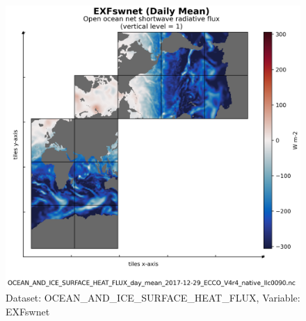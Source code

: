\begin{figure}[H]
\centering
\includegraphics[scale=0.55]{../images/plots/v4r4/native_plots/Ocean_and_Sea-Ice_Surface_Heat_Fluxes/EXFswnet.png}
\caption{Dataset: OCEAN\_AND\_ICE\_SURFACE\_HEAT\_FLUX, Variable: EXFswnet}
\label{tab:table-OCEAN_AND_ICE_SURFACE_HEAT_FLUX_EXFswnet-Plot}
\end{figure}
\newpage
\pagebreak
